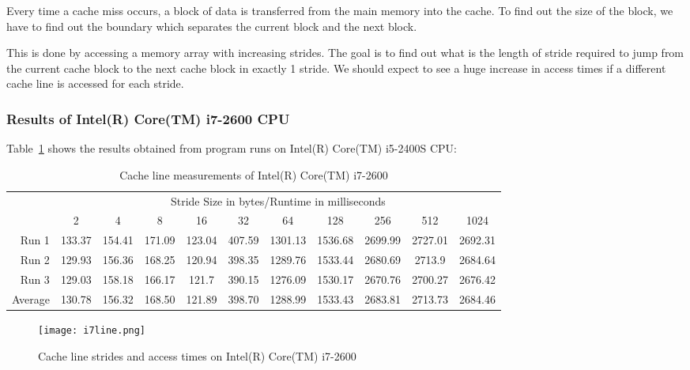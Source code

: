 \documentclass{article}
\begin{document}
Every time a cache miss occurs, a block of data is transferred from the main memory into the cache. To find out the size of the block, we have to find out the boundary which separates the current block and the next block.

This is done by accessing a memory array with increasing strides. The goal is to find out what is the length of stride required to jump from the current cache block to the next cache block in exactly 1 stride. We should expect to see a huge increase in access times if a different cache line is accessed for each stride.

\pagebreak
\subsubsection{Results of Intel(R) Core(TM) i7-2600 CPU}

Table~\ref{tab:i7cacheline} shows the results obtained from program runs on Intel(R) Core(TM) i5-2400S CPU:

\begin{table}[H]
\footnotesize 
\begin{tabular}{r|c|c|c|c|c|c|c|c|c|c|}

\multicolumn{1}{r}{}
 &  \multicolumn{10}{c}{Stride Size in bytes/Runtime in milliseconds} \\
\cline{2-11}
  & 2 & 4 & 8 & 16 & 32 & 64 & 128 & 256 & 512 & 1024\\
\cline{2-11}
Run 1 & 133.37 & 154.41 & 171.09 & 123.04 & 407.59 & 1301.13 & 1536.68 & 2699.99 & 2727.01 & 2692.31 \\
\cline{2-11}
Run 2 & 129.93 & 156.36 & 168.25 & 120.94 & 398.35 & 1289.76 & 1533.44 & 2680.69 & 2713.9 & 2684.64 \\
\cline{2-11}
Run 3 & 129.03 & 158.18 & 166.17 & 121.7 & 390.15 & 1276.09 & 1530.17 & 2670.76 & 2700.27 & 2676.42 \\
\cline{2-11}
Average & 130.78 & 156.32 & 168.50 & 121.89 &	398.70 & 1288.99 & 1533.43 & 2683.81 & 2713.73 & 2684.46 \\
\cline{2-11}
\end{tabular}
 \caption{Cache line measurements of Intel(R) Core(TM) i7-2600}
 \label{tab:i7cacheline}
\end{table}

\begin{figure}[H]
\centering
\texttt{[image: i7line.png]}
\caption{Cache line strides and access times on Intel(R) Core(TM) i7-2600}
\label{pic:i7line}
\end{figure}	
\end{document}
